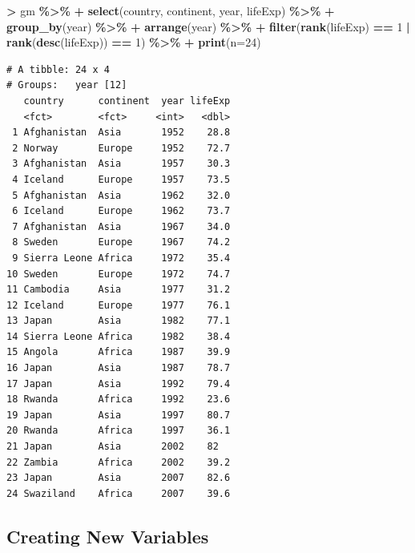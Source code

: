 \documentclass[
]{krantz}
\makeatletter
\newenvironment{Shaded}{\begin{snugshade}}{\end{snugshade}}
\newcommand{\DataTypeTok}[1]{\textcolor[rgb]{0.27,0.27,0.27}{#1}}
\newcommand{\DecValTok}[1]{\textcolor[rgb]{0.06,0.06,0.06}{#1}}
\newcommand{\KeywordTok}[1]{\textcolor[rgb]{0.27,0.27,0.27}{\textbf{#1}}}
\newcommand{\NormalTok}[1]{#1}
\newcommand{\OperatorTok}[1]{\textcolor[rgb]{0.43,0.43,0.43}{\textbf{#1}}}
\newcommand{\StringTok}[1]{\textcolor[rgb]{0.5,0.5,0.5}{#1}}
\newenvironment{kframe}{%
\medskip{}
\setlength{\fboxsep}{.8em}
 \def\at@end@of@kframe{}%
 \ifinner\ifhmode%
  \def\at@end@of@kframe{\end{minipage}}%
  \begin{minipage}{\columnwidth}%
 \fi\fi%
 \def\FrameCommand##1{\hskip\@totalleftmargin \hskip-\fboxsep
 \colorbox{shadecolor}{##1}\hskip-\fboxsep
     \hskip-\linewidth \hskip-\@totalleftmargin \hskip\columnwidth}%
 \MakeFramed {\advance\hsize-\width
   \@totalleftmargin\z@ \linewidth\hsize
   \@setminipage}}%
 {\par\unskip\endMakeFramed%
 \at@end@of@kframe}
\renewenvironment{Shaded}{\begin{kframe}}{\end{kframe}}
\makeatother
\begin{document}
\begin{Shaded}
\begin{Highlighting}[]
\OperatorTok{\textgreater{}}\StringTok{ }\NormalTok{gm }\OperatorTok{\%\textgreater{}\%}\StringTok{ }
\OperatorTok{+}\StringTok{   }\KeywordTok{select}\NormalTok{(country, continent, year, lifeExp) }\OperatorTok{\%\textgreater{}\%}\StringTok{ }
\OperatorTok{+}\StringTok{   }\KeywordTok{group\_by}\NormalTok{(year) }\OperatorTok{\%\textgreater{}\%}\StringTok{ }
\OperatorTok{+}\StringTok{   }\KeywordTok{arrange}\NormalTok{(year) }\OperatorTok{\%\textgreater{}\%}\StringTok{ }
\OperatorTok{+}\StringTok{   }\KeywordTok{filter}\NormalTok{(}\KeywordTok{rank}\NormalTok{(lifeExp) }\OperatorTok{==}\StringTok{ }\DecValTok{1} \OperatorTok{|}\StringTok{ }\KeywordTok{rank}\NormalTok{(}\KeywordTok{desc}\NormalTok{(lifeExp)) }\OperatorTok{==}\StringTok{ }\DecValTok{1}\NormalTok{) }\OperatorTok{\%\textgreater{}\%}\StringTok{ }
\OperatorTok{+}\StringTok{   }\KeywordTok{print}\NormalTok{(}\DataTypeTok{n=}\DecValTok{24}\NormalTok{)}
\end{Highlighting}
\end{Shaded}

\begin{verbatim}
# A tibble: 24 x 4
# Groups:   year [12]
   country      continent  year lifeExp
   <fct>        <fct>     <int>   <dbl>
 1 Afghanistan  Asia       1952    28.8
 2 Norway       Europe     1952    72.7
 3 Afghanistan  Asia       1957    30.3
 4 Iceland      Europe     1957    73.5
 5 Afghanistan  Asia       1962    32.0
 6 Iceland      Europe     1962    73.7
 7 Afghanistan  Asia       1967    34.0
 8 Sweden       Europe     1967    74.2
 9 Sierra Leone Africa     1972    35.4
10 Sweden       Europe     1972    74.7
11 Cambodia     Asia       1977    31.2
12 Iceland      Europe     1977    76.1
13 Japan        Asia       1982    77.1
14 Sierra Leone Africa     1982    38.4
15 Angola       Africa     1987    39.9
16 Japan        Asia       1987    78.7
17 Japan        Asia       1992    79.4
18 Rwanda       Africa     1992    23.6
19 Japan        Asia       1997    80.7
20 Rwanda       Africa     1997    36.1
21 Japan        Asia       2002    82  
22 Zambia       Africa     2002    39.2
23 Japan        Asia       2007    82.6
24 Swaziland    Africa     2007    39.6
\end{verbatim}

\hypertarget{creating-new-variables}{%
\subsection{Creating New Variables}\label{creating-new-variables}}
\end{document}
